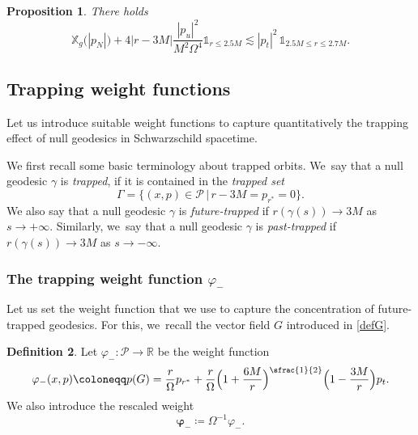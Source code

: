 \documentclass[JEP,XML,SOM,Unicode,published]{cedram}
\theoremstyle{plain}
\newtheorem{proposition}{Proposition}[section]
\theoremstyle{definition}
\newtheorem{definition}[proposition]{Definition}
\newcommand\R{{\mathbb{R}}}
\newcommand\T{{\mathbb{X}}}
\begin{document}
\begin{proposition}\label{Prorsweight}
There holds
\[
\T_g \bigl(|p_N| \bigr) +4|r-3M|\frac{|p_u|^2}{M^2\Omega^4} \mathds{1}_{r \leq 2.5M} \lesssim |p_t|^2 \, \mathds{1}_{2.5M \leq r \leq 2.7M}.
\]
\end{proposition}

\subsection{Trapping weight functions}\label{Subsecvarphi}

Let us introduce suitable weight functions to capture quantitatively the trapping effect of null geodesics in Schwarzschild spacetime.

We first recall some basic terminology about trapped orbits. We~say that a null geodesic $\gamma$ is \emph{trapped}, if it is contained in the \emph{trapped set}
\[
\Gamma=\bigl\{ (x,p)\in \mathcal{P} \, \big| \, r-3M=p_{r^*}=0 \bigr\}.
\]
We also say that a null geodesic $\gamma$ is \emph{future-trapped} if $r(\gamma(s))\to 3M$ as $s\to+\infty$. Similarly, we~say that a null geodesic $\gamma$ is \emph{past-trapped} if $r(\gamma(s))\to 3M$ as $s\to-\infty$.

\subsubsection{The trapping weight function $\varphi_-$}

Let us set the weight function that we use to capture the concentration of future-trapped geodesics. For this, we~recall the vector field $G$ introduced in \eqref{defG}.

\begin{definition}\label{Defvarphimin}
Let $\varphi_{-} \colon \mathcal{P}\to \R$ be the weight function
\[
\varphi_{-}(x,p)\coloneqq p(G)= \frac{r }{\Omega} p_{r^*} +\frac{r}{\Omega}\Bigl(1+\frac{6M}{r}\Bigr)^{\sfrac{1}{2}}\Bigl(1-\frac{3M}{r}\Bigr)p_t.
\]
We also introduce the rescaled weight
\begin{equation}\label{eq:defovphi}
\pmb{\varphi}_- \coloneqq \Omega^{-1}\varphi_-.
\end{equation}
\end{definition}
\end{document}
